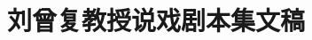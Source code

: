 \documentclass[12pt, oneside, a4paper]{article}      %
\title{\hei\Huge{刘曾复教授说戏剧本集文稿}}
\author[]{}   %
\date{} %
\begin{document}



%
\renewcommand{\abstractname}{\small{\CJKfamily{hei} 摘\quad 要}} %
\renewcommand{\contentsname}{\centering\CJKfamily{hei} 目~~~录}
\renewcommand{\refname}{\centering\CJKfamily{hei} 主~要~参~考~资~料}
\renewcommand{\figurename}{{\bf Fig}.}
\renewcommand{\tablename}{{\bf Tab}.}
\end{document}
